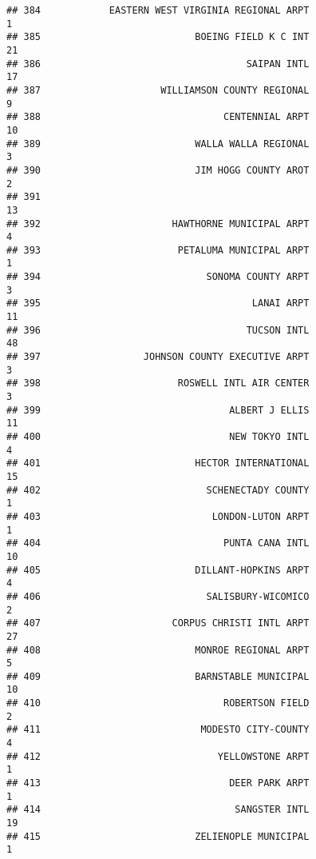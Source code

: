 \documentclass[
]{article}
\begin{document}
\begin{verbatim}
## 384            EASTERN WEST VIRGINIA REGIONAL ARPT                           1
## 385                           BOEING FIELD K C INT                          21
## 386                                    SAIPAN INTL                          17
## 387                     WILLIAMSON COUNTY REGIONAL                           9
## 388                                CENTENNIAL ARPT                          10
## 389                           WALLA WALLA REGIONAL                           3
## 390                           JIM HOGG COUNTY AROT                           2
## 391                                                                         13
## 392                       HAWTHORNE MUNICIPAL ARPT                           4
## 393                        PETALUMA MUNICIPAL ARPT                           1
## 394                             SONOMA COUNTY ARPT                           3
## 395                                     LANAI ARPT                          11
## 396                                    TUCSON INTL                          48
## 397                  JOHNSON COUNTY EXECUTIVE ARPT                           3
## 398                        ROSWELL INTL AIR CENTER                           3
## 399                                 ALBERT J ELLIS                          11
## 400                                 NEW TOKYO INTL                           4
## 401                           HECTOR INTERNATIONAL                          15
## 402                             SCHENECTADY COUNTY                           1
## 403                              LONDON-LUTON ARPT                           1
## 404                                PUNTA CANA INTL                          10
## 405                           DILLANT-HOPKINS ARPT                           4
## 406                             SALISBURY-WICOMICO                           2
## 407                       CORPUS CHRISTI INTL ARPT                          27
## 408                           MONROE REGIONAL ARPT                           5
## 409                           BARNSTABLE MUNICIPAL                          10
## 410                                ROBERTSON FIELD                           2
## 411                            MODESTO CITY-COUNTY                           4
## 412                               YELLOWSTONE ARPT                           1
## 413                                 DEER PARK ARPT                           1
## 414                                  SANGSTER INTL                          19
## 415                           ZELIENOPLE MUNICIPAL                           1

\end{verbatim}
\end{document}

